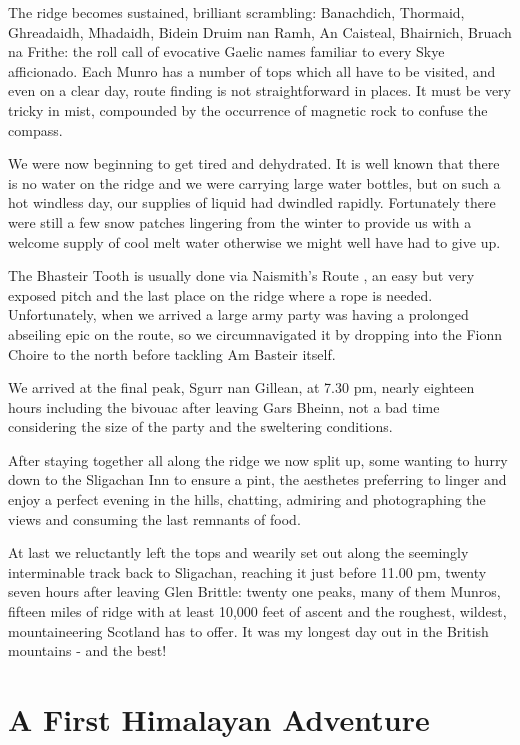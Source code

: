 \documentclass[a5paper,openany,font 10pt]{scrbook}
\begin{document}
The ridge becomes sustained, brilliant scrambling:
Banachdich, Thormaid, Ghreadaidh, Mhadaidh, Bidein Druim nan
Ramh, An  Caisteal, Bhairnich, Bruach na Frithe: the roll call of
evocative  Gaelic names familiar to every Skye afficionado. Each
Munro has a  number of tops which all have to be visited, and
even on a clear day,  route finding is not straightforward in
places. It must be very tricky  in mist, compounded by the
occurrence of magnetic rock to confuse the  compass.

We were now beginning to get tired and dehydrated. It is
well  known that there is no water on the ridge and we were
carrying large  water bottles, but on such a hot windless day,
our supplies of liquid  had dwindled rapidly. Fortunately there
were still a few snow patches  lingering from the winter to
provide us with a welcome supply of cool  melt water  otherwise
we might well have had to give up.

The Bhasteir  Tooth is usually done via  Naismith's Route , an
easy but very exposed  pitch and the last place on the ridge
where a rope is needed.  Unfortunately, when we arrived a large
army party was having a  prolonged abseiling epic on the route,
so we circumnavigated it by  dropping into the Fionn Choire to
the north before tackling Am Basteir itself.

We arrived at the final peak, Sgurr nan Gillean, at 7.30 pm,
nearly  eighteen hours  including the bivouac  after leaving Gars
Bheinn, not  a bad time considering the size of the party and the
sweltering  conditions.

After staying  together all along the ridge we now split up,
some wanting to  hurry down to the Sligachan Inn to ensure a
pint, the aesthetes preferring to linger and enjoy a perfect
evening in the hills,  chatting, admiring and photographing the
views and consuming the last  remnants of food.

At last we reluctantly left the tops and wearily set out
along the seemingly interminable track back to Sligachan,
reaching it just  before 11.00 pm, twenty seven hours after
leaving Glen Brittle: twenty one peaks, many of  them Munros,
fifteen miles of ridge with at least 10,000 feet of ascent and
the roughest, wildest, mountaineering Scotland has to offer. It
was my  longest day out in the British mountains - and the best!

\chapter{A First Himalayan Adventure}
\label{sec:org814bedd}
\end{document}
